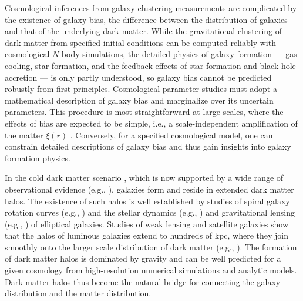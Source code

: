 \documentclass[]{emulateapj}
\begin{document}
Cosmological inferences from galaxy clustering measurements 
are complicated by the existence of galaxy bias, 
the difference between the distribution of galaxies and that of the underlying 
dark matter. 
While the gravitational clustering of dark matter from specified
initial conditions can be computed reliably with cosmological
$N$-body simulations, the detailed physics of galaxy formation ---
gas cooling, star formation, and the feedback effects
of star formation and black hole accretion --- is only partly 
understood, so galaxy bias cannot be predicted robustly from first
principles.  Cosmological parameter studies must adopt a mathematical
description of galaxy bias and marginalize over its uncertain 
parameters.  This procedure is most straightforward at large scales,
where the effects of bias are expected to be simple, i.e.,
a scale-independent amplification of the matter $\xi(r)$
\citep{kaiser84,BBKS86,coles93,fry93,mann98,scherrer98,narayanan00}.
Conversely, for a specified cosmological model, one can constrain 
detailed descriptions of galaxy bias and thus gain insights into
galaxy formation physics.

In the cold dark matter scenario \citep{peebles82,blumenthal84},
which is now supported by a wide range of observational evidence
(e.g., \citealt{dunkley09,reid10}), galaxies form and reside in extended 
dark matter halos. The existence of such halos is well established by 
studies of spiral galaxy rotation curves
(e.g., \citealt{rubin78,persic96,verheijen01}) and the stellar 
dynamics (e.g., \citealt{gerhard01}) and gravitational lensing
(e.g., \citealt{bolton08}) of elliptical galaxies.
Studies of weak lensing and satellite galaxies show that the halos 
of luminous galaxies extend to hundreds of kpc, where they join 
smoothly onto the larger scale distribution of dark matter
(e.g., \citealt{zaritsky94,fischer00,prada03,mandelbaum06}).
The formation of dark matter halos is
dominated by gravity and can be well predicted for a given cosmology from 
high-resolution numerical simulations and analytic models.
Dark matter halos thus become the natural bridge for
connecting the galaxy distribution and the matter distribution.
\end{document}
